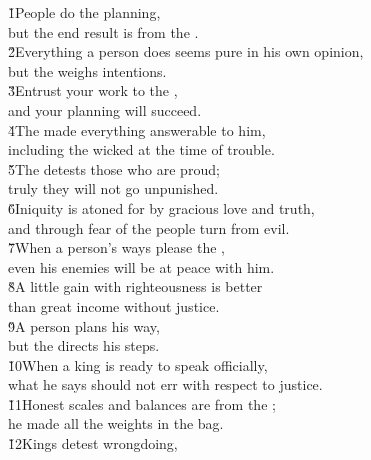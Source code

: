 \begin{poetry}
\poeml {}
\v{1}People do the planning, \\
\poeml but the end result is from the . \\
\poeml \v{2}Everything a person does seems pure in his own opinion, \\
\poemll    but the  weighs intentions. \\
\poeml \v{3}Entrust your work to the , \\
\poemll    and your planning will succeed. \\
\poeml \v{4}The  made everything answerable to him, \\
\poemll    including the wicked at the time of trouble. \\
\poeml \v{5}The  detests those who are proud; \\
\poemll    truly they will not go unpunished. \\
\poeml \v{6}Iniquity is atoned for by gracious love and truth, \\
\poemll    and through fear of the  people turn from evil. \\
\poeml \v{7}When a person's ways please the , \\
\poemll    even his enemies will be at peace with him. \\
\poeml \v{8}A little gain with righteousness is better \\
\poemll    than great income without justice. \\
\poeml \v{9}A person plans his way, \\
\poemll    but the  directs his steps. \\
\poeml \v{10}When a king is ready to speak officially, \\
\poemll    what he says should not err with respect to justice. \\
\poeml \v{11}Honest scales and balances are from the ; \\
\poemll    he made all the weights in the bag. \\
\poeml \v{12}Kings detest wrongdoing, \\

\end{poetry}
